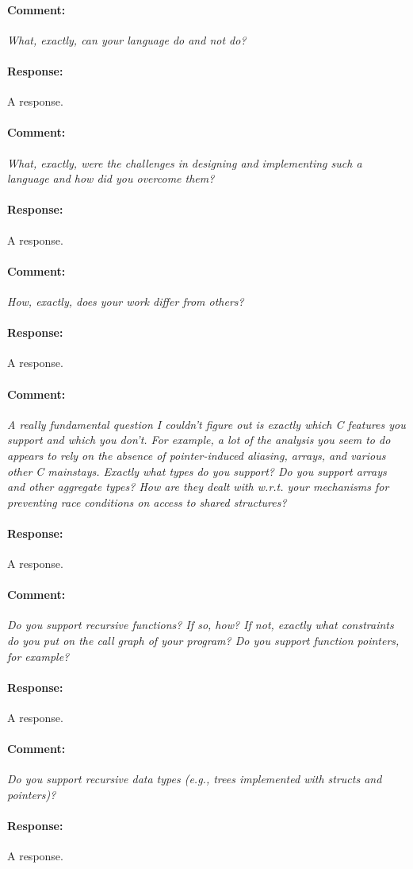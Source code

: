 \documentclass[a4paper,11pt]{article}
\newenvironment{comment}{\paragraph{Comment:}\em}{}
\newenvironment{response}{\paragraph{Response:}}{}
\begin{document}
\begin{comment}
	What, exactly, can your language do and not do?  
\end{comment}
\begin{response}
	A response.
\end{response}

\begin{comment}
	What, exactly, were the challenges in designing and implementing
	such a language and how did you overcome them?
\end{comment}
\begin{response}
	A response.
\end{response}

\begin{comment}
	How, exactly, does your work differ from others?
\end{comment}
\begin{response}
	A response.
\end{response}

\begin{comment}
	A really fundamental question I couldn't figure out is
	exactly which C features you support and which you don't.
	For example, a lot of the analysis you seem to do appears to
	rely on the absence of pointer-induced aliasing, arrays, and
	various other C mainstays. Exactly what types do you
	support? Do you support arrays and other aggregate types?
	How are they dealt with w.r.t. your mechanisms for
	preventing race conditions on access to shared structures?
\end{comment}
\begin{response}
	A response.
\end{response}

\begin{comment}
	Do you support recursive functions?  If so, how? If not,
	exactly what constraints do you put on the call graph of
	your program? Do you support function pointers, for example?
\end{comment}
\begin{response}
	A response.
\end{response}

\begin{comment}
	Do you support recursive data types (e.g., trees implemented
	with structs and pointers)?
\end{comment}
\begin{response}
	A response.
\end{response}
\end{document}
